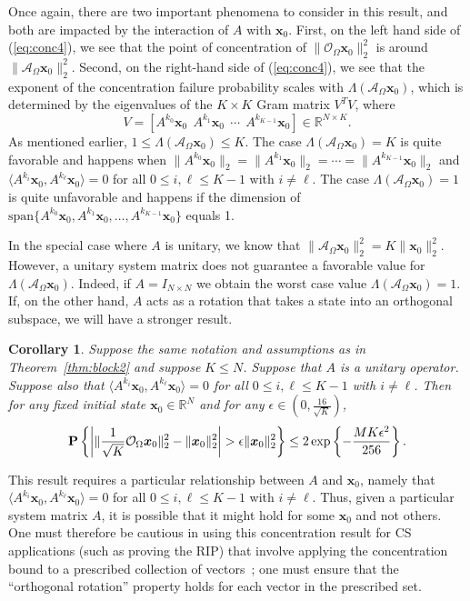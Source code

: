 \documentclass[11pt,draftcls,onecolumn]{IEEEtran}
\def\real    { \mathbb{R} }
\newtheorem{cor}{Corollary}
\newcommand{\eps}{\epsilon}
\newcommand{\Prob}[1]{{\bf P}\left\{#1\right\}}
\def \ok {{\mathcal{O}_{\Omega}}}
\def \ak {{\mathcal{A}_{\Omega}}}
\newcommand{\vc}[1]{\boldsymbol{#1}}
\def\real    { \mathbb{R} }
\begin{document}
Once again, there are two important phenomena to consider in this result, and both are impacted by the interaction of $A$ with $\vc{x}_0$.
First, on the left hand side of (\ref{eq:conc4}), we see that the point of concentration of $\|\ok \vc{x}_0 \|_{2}^{2}$ is around $\|\ak \vc{x}_0\|_2^2$. Second, on the right-hand side of (\ref{eq:conc4}), we see that the exponent of the concentration failure probability scales with $\Lambda(\ak \vc{x}_0)$, which is determined by the eigenvalues of the $K \times K$ Gram matrix $V^T V$, where
$$
V = \left[A^{k_0}\vc{x}_0 ~~ A^{k_1}\vc{x}_0 ~~ \cdots ~~ A^{k_{K-1}}\vc{x}_0 \right]\in \real^{N \times K}.
$$
As mentioned earlier, $1 \le \Lambda(\ak \vc{x}_0) \le K$. The case $\Lambda(\ak \vc{x}_0) = K$ is quite favorable and happens when $\|A^{k_0}\vc{x}_0\|_2 = \|A^{k_1}\vc{x}_0 \|_2 = \cdots = \|A^{k_{K-1}}\vc{x}_0 \|_2$ and $\langle A^{k_i} \vc{x}_0 , A^{k_{\ell}} \vc{x}_0 \rangle = 0$ for all $0 \le i,\ell \le K-1$ with $i \neq \ell$. The case $\Lambda(\ak \vc{x}_0) = 1$ is quite unfavorable and happens if the dimension of $\mathrm{span}\{A^{k_0}\vc{x}_0, A^{k_1}\vc{x}_0 , \dots, A^{k_{K-1}}\vc{x}_0 \}$ equals 1.

In the special case where $A$ is unitary, we know that $\|\ak \vc{x}_0\|_2^2  = K\|\vc{x}_0\|_2^2$. However, a unitary system matrix does not guarantee a favorable value for $\Lambda(\ak \vc{x}_0)$. Indeed, if $A=I_{N \times N}$ we obtain the worst case value $\Lambda(\ak \vc{x}_0) = 1$. If, on the other hand, $A$ acts as a rotation that takes a state into an orthogonal subspace, we will have a stronger result.

\begin{cor} Suppose the same notation and assumptions as in Theorem~\ref{thm:block2} and suppose $K \le N$. Suppose that $A$ is a unitary operator. Suppose also that $\langle A^{k_i} \vc{x}_0 , A^{k_{\ell}} \vc{x}_0 \rangle = 0$ for all $0 \le i,\ell \le K-1$ with $i \neq \ell$. Then for any fixed initial state $\vc{x}_0 \in \real^N$ and for any $\eps \in (0,\frac{16}{\sqrt{K}})$,
\begin{equation}
\Prob{\bigg{|}\|\frac{1}{\sqrt{K}}\ok \vc{x}_0 \|_{2}^{2}- \|\vc{x}_0\|_2^2\bigg{|}> \epsilon  \|\vc{x}_0\|_{2}^{2}}
\leq
2\exp\left\{-\frac{M K \epsilon^{2}}{256}\right\}.
\label{eq:conc5}
\end{equation}
\label{cor:indep_unitary_rotate}
\end{cor}

This result requires a particular relationship between $A$ and $\vc{x}_0$, namely that $\langle A^{k_i} \vc{x}_0 , A^{k_{\ell}} \vc{x}_0 \rangle = 0$ for all $0 \le i,\ell \le K-1$ with $i \neq \ell$. Thus, given a particular system matrix $A$, it is possible that it might hold for some $\vc{x}_0$ and not others. One must therefore be cautious in using this concentration result for CS applications (such as proving the RIP) that involve applying the concentration bound to a prescribed collection of vectors~\cite{baraniuk2008simple}; one must ensure that the ``orthogonal rotation'' property holds for each vector in the prescribed set.
\end{document}
